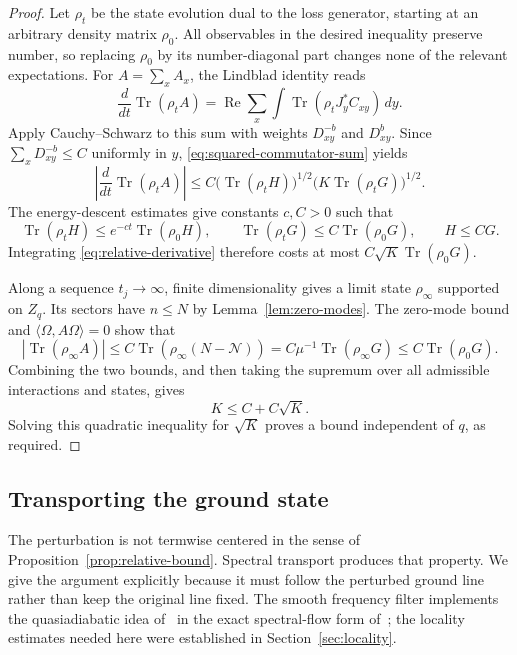 \begin{proof}
Let $\rho_t$ be the state evolution dual to the loss generator,
starting at an arbitrary density matrix $\rho_0$. All observables in
the desired inequality preserve number, so replacing $\rho_0$ by
its number-diagonal part changes none of the relevant expectations.
For $A=\sum_xA_x$, the Lindblad identity reads
\[
 \frac{d}{dt}\operatorname{Tr}(\rho_t A)
 =\operatorname{Re}\sum_x\int
       \operatorname{Tr}(\rho_t J_y^*C_{xy})\,dy.
\]
Apply Cauchy--Schwarz to this sum with weights $D_{xy}^{-b}$ and
$D_{xy}^{b}$. Since $\sum_xD_{xy}^{-b}\le C$ uniformly in $y$,
\eqref{eq:squared-commutator-sum} yields
\begin{equation}\label{eq:relative-derivative}
 \left|\frac{d}{dt}\operatorname{Tr}(\rho_t A)\right|
 \le C\bigl(\operatorname{Tr}(\rho_t H)\bigr)^{1/2}
          \bigl(K\operatorname{Tr}(\rho_t G)\bigr)^{1/2}.
\end{equation}
The energy-descent estimates give constants $c,C>0$ such that
\[
 \operatorname{Tr}(\rho_t H)\le e^{-ct}
          \operatorname{Tr}(\rho_0 H),\qquad
 \operatorname{Tr}(\rho_t G)\le C\operatorname{Tr}(\rho_0 G),
 \qquad H\le CG.
\]
Integrating \eqref{eq:relative-derivative} therefore costs at most
$C\sqrt K\operatorname{Tr}(\rho_0 G)$.

Along a sequence $t_j\to\infty$, finite dimensionality gives a
limit state $\rho_\infty$ supported on $Z_q$. Its sectors have
$n\le N$ by Lemma~\ref{lem:zero-modes}. The zero-mode bound and
$\langle\Omega,A\Omega\rangle=0$ show that
\[
 |\operatorname{Tr}(\rho_\infty A)|
 \le C\operatorname{Tr}(\rho_\infty(N-\mathcal N))
 =C\mu^{-1}\operatorname{Tr}(\rho_\infty G)
 \le C\operatorname{Tr}(\rho_0G).
\]
Combining the two bounds, and then taking the supremum over all
admissible interactions and states, gives
\[
 K\le C+C\sqrt K.
\]
Solving this quadratic inequality for $\sqrt K$ proves a bound
independent of $q$, as required.
\end{proof}

\subsection{Transporting the ground state}

The perturbation is not termwise centered in the sense of
Proposition~\ref{prop:relative-bound}. Spectral transport produces
that property. We give the argument explicitly because it must follow
the perturbed ground line rather than keep the original line fixed.
The smooth frequency filter implements the quasiadiabatic idea
of~\cite{HW} in the exact spectral-flow form of~\cite{BMNS}; the
locality estimates needed here were established
in Section~\ref{sec:locality}.

